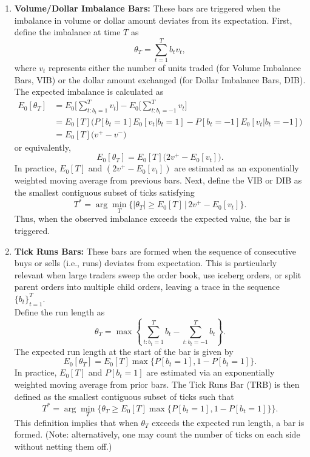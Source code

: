 \begin{remark}
\begin{enumerate}[label=\roman*.]
\item \textbf{Volume/Dollar Imbalance Bars:} These bars are triggered when the imbalance in volume or dollar amount deviates from its expectation. First, define the imbalance at time $T$ as
\[ \theta_T = \sum_{t=1}^{T} b_t v_t, \]
where $v_t$ represents either the number of units traded (for Volume Imbalance Bars, VIB) or the dollar amount exchanged (for Dollar Imbalance Bars, DIB). The expected imbalance is calculated as
\begin{align}
E_0[\theta_T] &= E_0\Bigg[\sum_{t: b_t=1}^{T} v_t\Bigg] - E_0\Bigg[\sum_{t: b_t=-1}^{T} v_t\Bigg] \nonumber \\
&= E_0[T]\Big(P[b_t = 1]E_0[v_t \vert b_t = 1] - P[b_t = -1]E_0[v_t \vert b_t = -1]\Big) \nonumber \\
&= E_0[T]\Big(v^+ - v^-\Big) \nonumber
\end{align}
or equivalently,
\[ E_0[\theta_T] = E_0[T]\Big(2v^+ - E_0[v_t]\Big). \]
In practice, $E_0[T]$ and $(2v^+ - E_0[v_t])$ are estimated as an exponentially weighted moving average from previous bars. Next, define the VIB or DIB as the smallest contiguous subset of ticks satisfying
\[ T^* = \arg \min_T \{ \lvert \theta_T \rvert \geq E_0[T] \, \vert \, 2v^+ - E_0[v_t] \}. \]
Thus, when the observed imbalance exceeds the expected value, the bar is triggered.

\item \textbf{Tick Runs Bars:} These bars are formed when the sequence of consecutive buys or sells (i.e., runs) deviates from expectation. This is particularly relevant when large traders sweep the order book, use iceberg orders, or split parent orders into multiple child orders, leaving a trace in the sequence $\{b_t\}_{t=1}^{T}$.\\
Define the run length as
\[ \theta_T = \max \left\{ \sum_{t: b_t = 1}^{T} b_t - \sum_{t: b_t = -1}^{T} b_t \right\}. \]
The expected run length at the start of the bar is given by
\[ E_0[\theta_T] = E_0[T] \max\{P[b_t = 1], 1 - P[b_t = 1]\}. \]
In practice, $E_0[T]$ and $P[b_t = 1]$ are estimated via an exponentially weighted moving average from prior bars. The Tick Runs Bar (TRB) is then defined as the smallest contiguous subset of ticks such that
\[ T^* = \arg \min_T \Big\{ \theta_T \geq E_0[T] \max\{P[b_t = 1], 1 - P[b_t = 1]\} \Big\}. \]
This definition implies that when $\theta_T$ exceeds the expected run length, a bar is formed. (Note: alternatively, one may count the number of ticks on each side without netting them off.)


\end{enumerate}
\end{remark}
